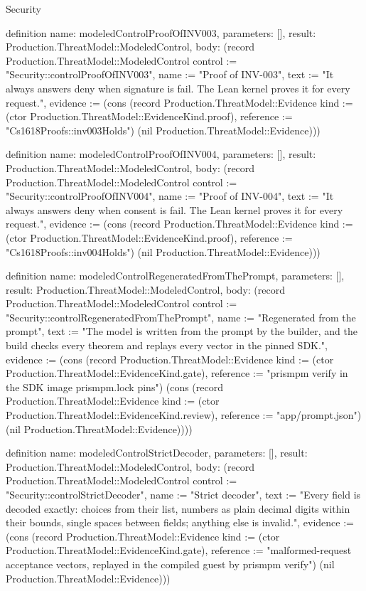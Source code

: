 \begin{lexlean}{Security}
\begin{semanticmodule}
definition{
  name: modeledControlProofOfINV003,
  parameters: [],
  result: Production.ThreatModel::ModeledControl,
  body: (record Production.ThreatModel::ModeledControl {control := "Security::controlProofOfINV003", name := "Proof of INV-003", text := "It always answers deny when signature is fail. The Lean kernel proves it for every request.", evidence := (cons (record Production.ThreatModel::Evidence {kind := (ctor Production.ThreatModel::EvidenceKind.proof), reference := "Cs1618Proofs::inv003Holds"}) (nil Production.ThreatModel::Evidence))})
}

definition{
  name: modeledControlProofOfINV004,
  parameters: [],
  result: Production.ThreatModel::ModeledControl,
  body: (record Production.ThreatModel::ModeledControl {control := "Security::controlProofOfINV004", name := "Proof of INV-004", text := "It always answers deny when consent is fail. The Lean kernel proves it for every request.", evidence := (cons (record Production.ThreatModel::Evidence {kind := (ctor Production.ThreatModel::EvidenceKind.proof), reference := "Cs1618Proofs::inv004Holds"}) (nil Production.ThreatModel::Evidence))})
}

definition{
  name: modeledControlRegeneratedFromThePrompt,
  parameters: [],
  result: Production.ThreatModel::ModeledControl,
  body: (record Production.ThreatModel::ModeledControl {control := "Security::controlRegeneratedFromThePrompt", name := "Regenerated from the prompt", text := "The model is written from the prompt by the builder, and the build checks every theorem and replays every vector in the pinned SDK.", evidence := (cons (record Production.ThreatModel::Evidence {kind := (ctor Production.ThreatModel::EvidenceKind.gate), reference := "prismpm verify in the SDK image prismpm.lock pins"}) (cons (record Production.ThreatModel::Evidence {kind := (ctor Production.ThreatModel::EvidenceKind.review), reference := "app/prompt.json"}) (nil Production.ThreatModel::Evidence)))})
}

definition{
  name: modeledControlStrictDecoder,
  parameters: [],
  result: Production.ThreatModel::ModeledControl,
  body: (record Production.ThreatModel::ModeledControl {control := "Security::controlStrictDecoder", name := "Strict decoder", text := "Every field is decoded exactly: choices from their list, numbers as plain decimal digits within their bounds, single spaces between fields; anything else is invalid.", evidence := (cons (record Production.ThreatModel::Evidence {kind := (ctor Production.ThreatModel::EvidenceKind.gate), reference := "malformed-request acceptance vectors, replayed in the compiled guest by prismpm verify"}) (nil Production.ThreatModel::Evidence))})
}


\end{semanticmodule}
\end{lexlean}
